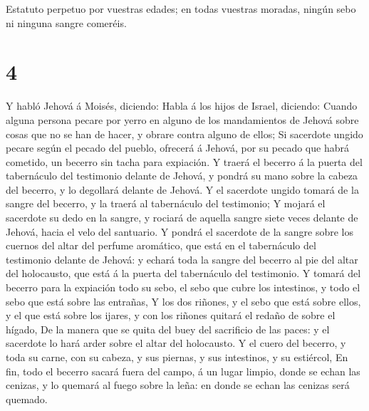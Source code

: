  Estatuto perpetuo por vuestras edades; en todas vuestras
moradas, ningún sebo ni ninguna sangre comeréis.

\hypertarget{section-3}{%
\section{4}\label{section-3}}

 Y habló Jehová á Moisés, diciendo:  Habla á los
hijos de Israel, diciendo: Cuando alguna persona pecare por yerro en
alguno de los mandamientos de Jehová sobre cosas que no se han de hacer,
y obrare contra alguno de ellos;  Si sacerdote ungido pecare
según el pecado del pueblo, ofrecerá á Jehová, por su pecado que habrá
cometido, un becerro sin tacha para expiación.  Y traerá el
becerro á la puerta del tabernáculo del testimonio delante de Jehová, y
pondrá su mano sobre la cabeza del becerro, y lo degollará delante de
Jehová.  Y el sacerdote ungido tomará de la sangre del
becerro, y la traerá al tabernáculo del testimonio;  Y
mojará el sacerdote su dedo en la sangre, y rociará de aquella sangre
siete veces delante de Jehová, hacia el velo del santuario. 
Y pondrá el sacerdote de la sangre sobre los cuernos del altar del
perfume aromático, que está en el tabernáculo del testimonio delante de
Jehová: y echará toda la sangre del becerro al pie del altar del
holocausto, que está á la puerta del tabernáculo del testimonio.
 Y tomará del becerro para la expiación todo su sebo, el
sebo que cubre los intestinos, y todo el sebo que está sobre las
entrañas,  Y los dos riñones, y el sebo que está sobre
ellos, y el que está sobre los ijares, y con los riñones quitará el
redaño de sobre el hígado,  De la manera que se quita del
buey del sacrificio de las paces: y el sacerdote lo hará arder sobre el
altar del holocausto.  Y el cuero del becerro, y toda su
carne, con su cabeza, y sus piernas, y sus intestinos, y su estiércol,
 En fin, todo el becerro sacará fuera del campo, á un lugar
limpio, donde se echan las cenizas, y lo quemará al fuego sobre la leña:
en donde se echan las cenizas será quemado.

